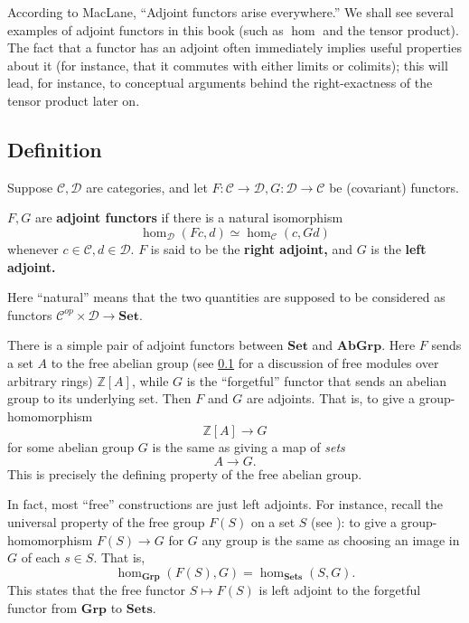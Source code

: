 According to MacLane, ``Adjoint functors arise everywhere.'' We shall see
several examples of adjoint functors in this book (such as $\hom$ and the
tensor product). The fact that a functor has an adjoint often immediately
implies useful properties about it (for instance, that it commutes with either
limits or colimits); this will lead, for instance, to conceptual arguments
behind the right-exactness of the tensor product later on.


\subsection{Definition}

Suppose $\mathcal{C}, \mathcal{D}$ are categories, and let $F: \mathcal{C} \to
\mathcal{D}, G: \mathcal{D} \to \mathcal{C}$ be (covariant) functors.

\begin{definition} 
$F, G$ are \textbf{adjoint functors} if there is a natural isomorphism
\[ \hom_{\mathcal{D}}(Fc, d) \simeq \hom_{\mathcal{C}}(c, Gd)  \]
whenever $c \in \mathcal{C}, d \in \mathcal{D}$. $F$ is said to be the
\textbf{right adjoint,} and $G$ is the \textbf{left adjoint.}
\end{definition} 

Here ``natural'' means that the two quantities are supposed to be considered
as functors $\mathcal{C}^{op} \times \mathcal{D} \to \mathbf{Set}$.

\begin{example} 
There is a simple pair of adjoint functors between $\mathbf{Set}$ and $\mathbf{AbGrp}$. Here
$F$ sends  a set $A$ to the free abelian group (see \cref{} for a discussion
of free modules over arbitrary rings) $\mathbb{Z}[A]$, while $G$ is
the ``forgetful'' functor that sends an abelian group to its underlying set. 
Then $F$ and $G$ are adjoints. That is, to give a group-homomorphism
\[ \mathbb{Z}[A] \to G  \]
for some abelian group $G$ 
is the same as giving a map of \emph{sets}
\[ A \to G.  \]
This is precisely the defining property of the free abelian group.
\end{example} 

\begin{example}
In fact, most ``free'' constructions are just left adjoints.
For instance, recall the universal property of the free group $F(S)$ on a set $S$ (see
\cite{La02}): to give a group-homomorphism $F(S) \to G$ for $G$ any group is
the same as choosing an image in $G$ of each $s \in S$.
That is,
\[ \hom_{\mathbf{Grp}}(F(S), G) = \hom_{\mathbf{Sets}}(S, G).  \]
This states that the free functor $S \mapsto F(S)$ is left adjoint to the
forgetful functor from $\mathbf{Grp}$ to $\mathbf{Sets}$.
\end{example}

